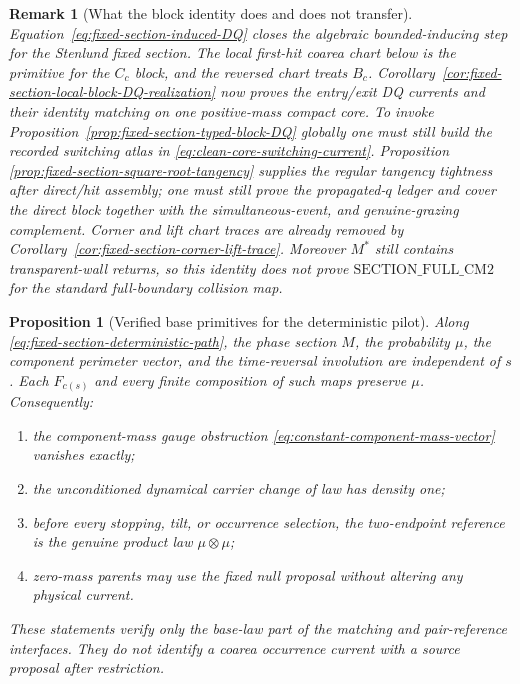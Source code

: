 \documentclass[11pt]{article}
\newtheorem{proposition}[theorem]{Proposition}
\newtheorem{remark}[theorem]{Remark}
\begin{document}
\begin{remark}[What the block identity does and does not transfer]
\label{rem:fixed-section-block-frontier}
Equation~\eqref{eq:fixed-section-induced-DQ} closes the algebraic
bounded-inducing step for the Stenlund fixed section.  The local first-hit
coarea chart below is the primitive for the $C_c$ block, and the reversed
chart treats $B_c$.  Corollary~\ref{cor:fixed-section-local-block-DQ-realization}
now proves the entry/exit DQ currents and their identity matching on one
positive-mass compact core.  To invoke
Proposition~\ref{prop:fixed-section-typed-block-DQ} globally one must still
build the recorded switching atlas in
\eqref{eq:clean-core-switching-current}.  Proposition~
\ref{prop:fixed-section-square-root-tangency} supplies the regular tangency
tightness after direct/hit assembly; one must still prove the propagated-$q$
ledger and cover the direct block together with the simultaneous-event,
and genuine-grazing complement.  Corner and lift chart traces are already
removed by Corollary~\ref{cor:fixed-section-corner-lift-trace}.  Moreover $M^*$ still contains transparent-wall
returns, so this identity does not prove
$\mathrm{SECTION\_FULL\_CM2}$ for the standard full-boundary collision map.
\end{remark}

\begin{proposition}[Verified base primitives for the deterministic pilot]
\label{prop:fixed-section-verified-primitives}
Along \eqref{eq:fixed-section-deterministic-path}, the phase section $M$,
the probability $\mu$, the component perimeter vector, and the time-reversal
involution are independent of $s$.  Each $F_{c(s)}$ and every finite
composition of such maps preserve $\mu$.  Consequently:
\begin{enumerate}[label=\textup{(V\arabic*)}]
\item the component-mass gauge obstruction
      \eqref{eq:constant-component-mass-vector} vanishes exactly;
\item the unconditioned dynamical carrier change of law has density one;
\item before every stopping, tilt, or occurrence selection, the two-endpoint
      reference is the genuine product law $\mu\otimes\mu$;
\item zero-mass parents may use the fixed null proposal without altering any
      physical current.
\end{enumerate}
These statements verify only the base-law part of the matching and
pair-reference interfaces.  They do not identify a coarea occurrence current
with a source proposal after restriction.
\end{proposition}
\end{document}
